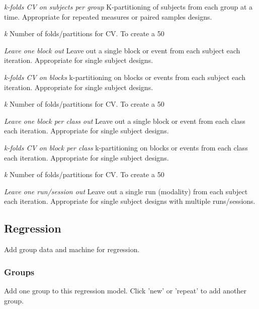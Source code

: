 \textit{k-folds CV on subjects per group}
K-partitioning of subjects from each group at a time. Appropriate for repeated measures or paired samples designs.


\textit{k}
Number of folds/partitions for CV. To create a 50%


\textit{Leave one block out}
Leave out a single block or event from each subject each iteration. Appropriate for single subject designs.


\textit{k-folds CV on blocks}
k-partitioning on blocks or events from each subject each iteration. Appropriate for single subject designs.


\textit{k}
Number of folds/partitions for CV. To create a 50%


\textit{Leave one block per class out}
Leave out a single block or event from each class each iteration. Appropriate for single subject designs.


\textit{k-folds CV on block per class}
k-partitioning on blocks or events from each class each iteration. Appropriate for single subject designs.


\textit{k}
Number of folds/partitions for CV. To create a 50%


\textit{Leave one run/session out}
Leave out a single run (modality) from each subject each iteration. Appropriate for single subject designs with multiple runs/sessions.


\subsection{Regression}
Add group data and machine for regression.


\subsubsection{Groups}
Add one group to this regression model. Click 'new' or 'repeat' to add another group.


